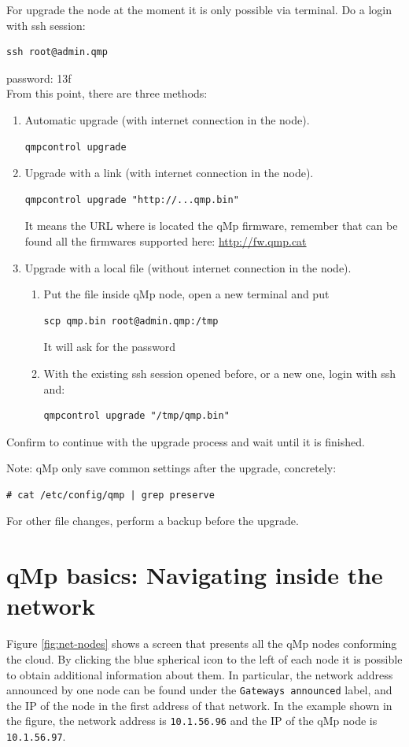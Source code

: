 \documentclass[11pt]{article}
\begin{document}
For upgrade the node at the moment it is only possible via
terminal. Do a login with ssh session:
\begin{verbatim}
ssh root@admin.qmp
\end{verbatim}
password: 13f \\
From this point, there are three methods:
\begin{enumerate}
\item Automatic upgrade (with internet connection in the node).
\begin{verbatim}
qmpcontrol upgrade
\end{verbatim}
\item Upgrade with a link (with internet connection in the node).
\begin{verbatim}
qmpcontrol upgrade "http://...qmp.bin"
\end{verbatim}
It means the URL where is located the qMp firmware, remember that
can be found all the firmwares supported here: \url{http://fw.qmp.cat}
\item Upgrade with a local file (without internet connection in the node).
\begin{enumerate}
\item Put the file inside qMp node, open a new terminal and put
\begin{verbatim}
scp qmp.bin root@admin.qmp:/tmp
\end{verbatim}
It will ask for the password
\item With the existing ssh session opened before, or a new one,
login with ssh and:
\begin{verbatim}
qmpcontrol upgrade "/tmp/qmp.bin"
\end{verbatim}
\end{enumerate}
\end{enumerate}
Confirm to continue with the upgrade process and wait until it is finished.

Note: qMp only save common settings after the upgrade, concretely:
\begin{verbatim}
# cat /etc/config/qmp | grep preserve
\end{verbatim}

For other file changes, perform a backup before the upgrade.
\section{qMp basics: Navigating inside the network}
\label{sec-7}
Figure \ref{fig:net-nodes} shows a screen that presents all the qMp nodes
conforming the cloud. By clicking the blue spherical icon to the left
of each node it is possible to obtain additional information about
them. In particular, the network address announced by one node can be
found under the \texttt{Gateways announced} label, and the IP of the node in
the first address of that network. In the example shown in the figure,
the network address is \texttt{10.1.56.96} and the IP of the qMp node is
\texttt{10.1.56.97}.
\end{document}
